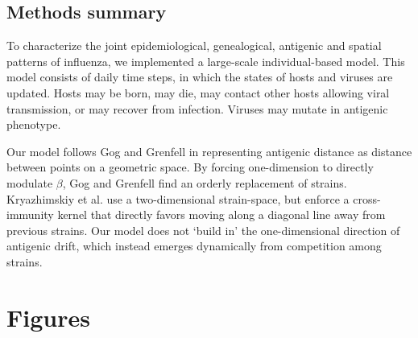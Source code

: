 \subsection*{Methods summary}

To characterize the joint epidemiological, genealogical, antigenic and spatial patterns of influenza, we implemented a large-scale individual-based model.  This model consists of daily time steps, in which the states of hosts and viruses are updated.  Hosts may be born, may die, may contact other hosts allowing viral transmission, or may recover from infection.  Viruses may mutate in antigenic phenotype.

Our model follows Gog and Grenfell \cite{Gog02} in representing antigenic distance as distance between points on a geometric space.  By forcing one-dimension to directly modulate $\beta$, Gog and Grenfell find an orderly replacement of strains.  Kryazhimskiy et al. \cite{Kryazhimskiy07} use a two-dimensional strain-space, but enforce a cross-immunity kernel that directly favors moving along a diagonal line away from previous strains.  Our model does not `build in' the one-dimensional direction of antigenic drift, which instead emerges dynamically from competition among strains.





\pagebreak

\section*{Figures}


